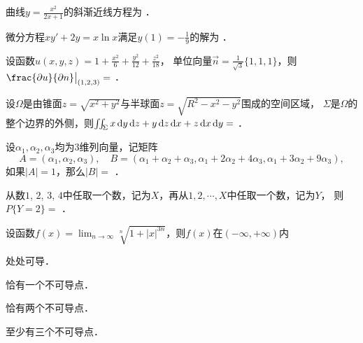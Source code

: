 \documentclass[plain,noanswer,medmath]{../../template/jnuexam}
\begin{document}




\begin{problem}
曲线$y = \frac{x^2}{2x + 1}$的斜渐近线方程为 \fillin{}．
\end{problem}


\begin{problem}
微分方程$xy' + 2y = x\ln x$满足$y(1) = - \frac{1}{9}$的解为 \fillin{}．
\end{problem}


\begin{problem}
设函数$u(x,y,z) = 1 + \frac{x^2}{6} + \frac{y^2}{12} + \frac{z^2}{18}$，
单位向量$\vec{n} = \frac{1}{\sqrt{3}}\{1,1,1\}$，则$\frac{\pdu}{\pdn}\big|_{(1,2,3)} =$ \fillin{}．
\end{problem}


\begin{problem}
设$\Omega$是由锥面$z = \sqrt{x^2 + y^2}$与半球面$z = \sqrt{R^2 - x^2 - y^2}$围成的空间区域，
$\Sigma$是$\Omega$的整个边界的外侧，则$\iint_{\Sigma}x\mathop{}\!\mathrm{d} y\mathop{}\!\mathrm{d} z + y\mathop{}\!\mathrm{d} z\mathop{}\!\mathrm{d} x + z\mathop{}\!\mathrm{d} x\mathop{}\!\mathrm{d} y =$ \fillin{}．
\end{problem}


\begin{problem}
设$\alpha_1,\alpha_2,\alpha_3$均为3维列向量，记矩阵
$$A = (\alpha_1,\alpha_2,\alpha_3),\quad
  B = (\alpha_1 + \alpha_2 + \alpha_3,\alpha_1 + 2\alpha_2 + 4\alpha_3,\alpha_1 + 3\alpha_2 + 9\alpha_3),$$
如果$|A| = 1$，那么$|B| =$ \fillin{}．
\end{problem}


\begin{problem}
从数$1$, $2$, $3$, $4$中任取一个数，记为$X$，再从$1,2, \cdots ,X$中任取一个数，记为$Y$，
则$P\{Y = 2\} =$ \fillin{}．
\end{problem}




\begin{problem}
设函数$f(x) = \lim_{n \to \infty} \sqrt[n]{1+|x|^{3n}}$，则$f(x)$在$(-\infty , +\infty)$内\pickout{}
\begin{abcd}
\item 处处可导．
\item 恰有一个不可导点．
\item 恰有两个不可导点．
\item 至少有三个不可导点．
\end{abcd}
\end{problem}
\end{document}

